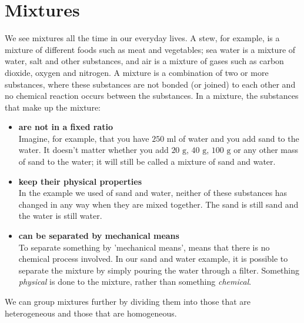 \label{m38708*cid2}
            \section{Mixtures}
            \nopagebreak
            \label{m38708*id62584}We see mixtures all the time in our everyday lives. A stew, for example, is a mixture of different foods such as meat and vegetables; sea water is a mixture of water, salt and other substances, and air is a mixture of gases such as carbon dioxide, oxygen and nitrogen.
 { A mixture is a combination of two or more substances, where these substances are not bonded (or joined) to each other and no chemical reaction occurs between the substances. } 
In a mixture, the substances that make up the mixture:
\begin{itemize}[noitemsep]
\item \textbf{are not in a fixed ratio} \\
Imagine, for example, that you have $250 \text{ ml}$ of water and you add sand to the water. It doesn't matter whether you add $20 \text{ g}$, $40 \text{ g}$, $100 \text{ g}$ or any other mass of sand to the water; it will still be called a mixture of sand and water.
\item \textbf{keep their physical properties} \\
In the example we used of sand and water, neither of these substances has changed in any way when they are mixed together. The sand is still sand and the water is still water.
\item \textbf{can be separated by mechanical means} \\
To separate something by 'mechanical means', means that there is no chemical process involved. In our sand and water example, it is possible to separate the mixture by simply pouring the water through a filter. Something \textsl{physical} is done to the mixture, rather than something \textsl{chemical}.
\end{itemize}
We can group mixtures further by dividing them into those that are heterogeneous and those that are homogeneous.
      \label{m38708*uid5}
